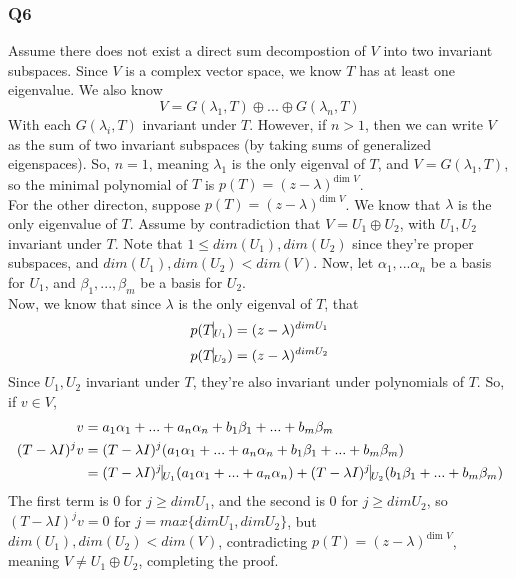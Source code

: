 \documentclass{article}
\begin{document}
\subsubsection*{Q6}
Assume there does not exist a direct sum decompostion of $V$ into two invariant subspaces. Since $V$ is a complex vector space, we know $T$ has at least one eigenvalue. We also know \[
V = G(\lambda_{1}, T) \oplus ... \oplus G(\lambda_{n}, T)
\]
With each $G(\lambda_{i}, T)$ invariant under $T$. However, if $n>1$, then we can write $V$ as the sum of two invariant subspaces (by taking sums of generalized eigenspaces). So, $n = 1$, meaning $\lambda_{1}$ is the only eigenval of $T$, and $V = G(\lambda_{1}, T)$, so the minimal polynomial of $T$ is $p(T) = (z-\lambda)^{\text{dim } V}$. \\
For the other directon, suppose $p(T) = (z-\lambda)^{\text{dim } V}$. We know that $\lambda$ is the only eigenvalue of $T$. Assume by contradiction that $V = U_{1} \oplus U_{2}$, with $U_1, U_2$ invariant under $T$. Note that $1 \leq dim(U_1), dim(U_2)$ since they're proper subspaces, and $dim(U_1), dim(U_2) < dim(V)$. Now, let $\alpha_{1},...\alpha_{n}$ be a basis for $U_{1}$, and $\beta_{1}, ..., \beta_{m}$ be a basis for $U_{2}$.\\
Now, we know that since $\lambda$ is the only eigenval of $T$, that \[
p(T\vline_{U_{1}}) = (z-\lambda)^{dim U_{1}}\\
\]
\[
p(T\vline_{U_{2}}) = (z-\lambda)^{dim U_{2}}
\]
Since $U_{1}, U_{2}$ invariant under $T$, they're also invariant under polynomials of $T$. So, if $v \in V$, 
\begin{align*}
v &= a_{1}\alpha_{1} + ... + a_{n}\alpha_{n} + b_{1}\beta_{1} + ... + b_{m}\beta_{m}\\
(T-\lambda I)^{j}v &= (T-\lambda I)^{j}(a_{1}\alpha_{1} + ... + a_{n}\alpha_{n} + b_{1}\beta_{1} + ... + b_{m}\beta_{m})\\
&=(T-\lambda I)^{j}\vline_{U_{1}}(a_{1}\alpha_{1} + ... + a_{n}\alpha_{n}) + (T-\lambda I)^{j}\vline_{U_{2}}(b_{1}\beta_{1} + ... + b_{m}\beta_{m})\\
\end{align*}
The first term is 0 for $j \geq dim U_{1}$, and the second is 0 for $j \geq dim U_{2}$, so $(T-\lambda I)^{j}v = 0$ for $j = max\{dim U_{1}, dim U_{2}\}$, but $dim(U_1), dim(U_2) < dim(V)$, contradicting $p(T) = (z-\lambda)^{\text{dim } V}$, meaning $V \neq U_{1} \oplus U_{2}$, completing the proof.
\end{document}
